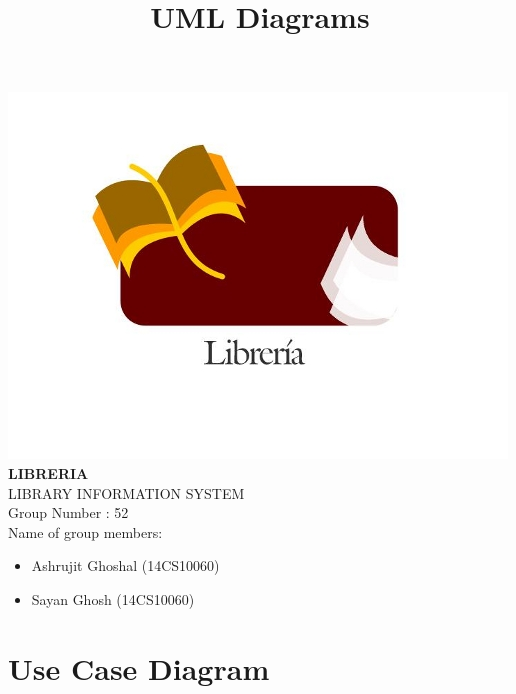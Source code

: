 \documentclass{article}
\title{\textbf{ UML Diagrams}}
\author{}
\date{}
\begin{document}
\maketitle
\begin{center}
\includegraphics[scale=0.6]{images/logoLIS_modified.jpg}
\\
\textbf{LIBRERIA}\\
LIBRARY INFORMATION SYSTEM\\
Group Number : 52\\
 Name of group members: \\
\begin{itemize}
\item \begin{center}Ashrujit Ghoshal (14CS10060)\end{center}
\item \begin{center}Sayan Ghosh (14CS10060)\end{center}
\end{itemize}

\end{center}
\newpage
\hypertarget{toc}{}
\tableofcontents
\newpage

\section{Use Case Diagram}
\end{document}

